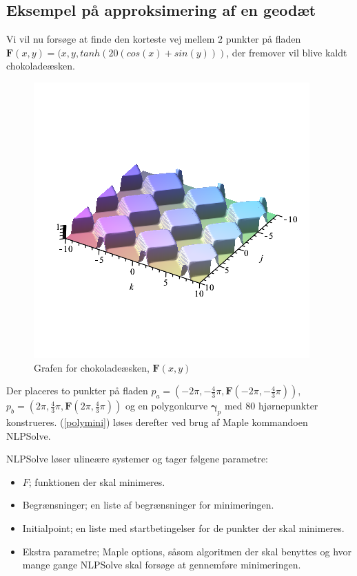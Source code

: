 \subsection{Eksempel på approksimering af en geodæt}
Vi vil nu forsøge at finde den korteste vej mellem 2 punkter på fladen \(\pmb{F}(x,y)=(x,y,tanh(20(cos(x)+sin(y)))\), der fremover vil blive kaldt chokoladeæsken.
\begin{figure}
\center
\includegraphics[scale=0.4]{pictures/chokobox.png}
\caption{Grafen for chokoladeæsken, \(\pmb{F}(x,y)\)}
\end{figure}


Der placeres to punkter på fladen \(p_a=(-2\pi, -\frac{4}{3}\pi,\pmb{F}(-2\pi, -\frac{4}{3}\pi))\), \(p_b=(2\pi, \frac{4}{3}\pi,\pmb{F}(2\pi, \frac{4}{3}\pi))\) og en polygonkurve \(\pmb{\gamma}_p\) med 80 hjørnepunkter konstrueres. (\ref{polymini}) løses derefter ved brug af Maple kommandoen NLPSolve.

NLPSolve løser ulineære systemer og tager følgene parametre:
\begin{itemize}
\item \(F\); funktionen der skal minimeres.
\item Begrænsninger; en liste af begrænsninger for minimeringen.
\item Initialpoint; en liste med startbetingelser for de punkter der skal minimeres.
\item Ekstra parametre; Maple options, såsom algoritmen der skal benyttes og hvor mange gange NLPSolve skal forsøge at gennemføre minimeringen.
\end{itemize}

